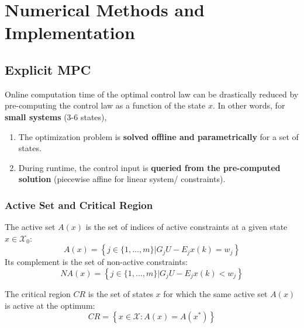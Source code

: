 \section{Numerical Methods and Implementation}

\subsection{Explicit MPC}
Online computation time of the optimal control law can be drastically reduced by pre-computing the control law as a function of the state $x$.
In other words, for \textbf{small systems} (3-6 states),
\begin{enumerate}
    \item The optimization problem is \textbf{solved offline and parametrically} for a set of states.
    \item During runtime, the control input is \textbf{queried from the pre-computed solution} (piecewise affine for linear system/ constraints).
\end{enumerate}

\subsubsection{Active Set and Critical Region}

The active set $A(x)$ is the set of indices of active constraints at a given state $x\in \mathcal{X}_0$:
\begin{equation*}
    A(x) = \left\{ j \in \{1,\ldots,m\} \Big| G_j U - E_j x(k) = w_j \right\}
\end{equation*}
Its complement is the set of non-active constraints:
\begin{equation*}
    NA(x) = \left\{ j \in \{1,\ldots,m\} \Big| G_j U - E_j x(k) < w_j \right\}
\end{equation*}

\newpar{}

The critical region $CR$ is the set of states $x$ for which the same active set $A(x)$ is active at the optimum:
\begin{equation*}
    CR = \left\{x\in \mathcal{X} : A(x)=A(x^*)\right\}
\end{equation*}

